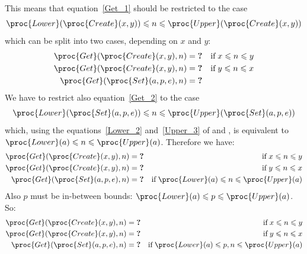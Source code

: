 \begin{itemize}
  This means that equation~\ref{Get_1} should be restricted to the
  case
  \[
    \proc{Lower} (\proc{Create} (x, y)) \leqslant n
    \leqslant \proc{Upper} (\proc{Create} (x, y))
  \]
  which can be split into two cases, depending on \(x\) and \(y\):
  \begin{align*}
     \proc{Get} (\proc{Create} (x, y), n)
  &= \textbf{?}
  & \text{if} \; x \leqslant n \leqslant y\\
     \proc{Get} (\proc{Create} (x, y), n)
  &= \textbf{?}
  & \text{if} \; y \leqslant n \leqslant x\\
     \proc{Get} (\proc{Set} (a, p, e), n)
  &= \textbf{?}
  \end{align*}
  We have to restrict also equation~\ref{Get_2} to the case
  \[
    \proc{Lower} (\proc{Set} (a, p, e)) \leqslant n
    \leqslant \proc{Upper} (\proc{Set} (a, p, e))
  \]
  which, using the equations~\ref{Lower_2} and~\ref{Upper_3} of
   and , is equivalent to
  \(
    \proc{Lower} (a) \leqslant n \leqslant \proc{Upper} (a)
  \).
  Therefore we have:
  \begin{align*}
     \proc{Get} (\proc{Create} (x, y), n)
  &= \textbf{?}
  & \text{if} \; x \leqslant n \leqslant y\\
     \proc{Get} (\proc{Create} (x, y), n)
  &= \textbf{?}
  & \text{if} \; y \leqslant n \leqslant x\\
     \proc{Get} (\proc{Set} (a, p, e), n)
  &= \textbf{?}
  & \text{if} \;\proc{Lower} (a) \leqslant n \leqslant \proc{Upper} (a)
  \end{align*}
  Also \(p\) must be in-between bounds:
  \(\proc{Lower} (a) \leqslant p \leqslant \proc{Upper} (a)\).
  So:
  \begin{align*}
     \proc{Get} (\proc{Create} (x, y), n)
  &= \textbf{?}
  & \text{if} \; x \leqslant n \leqslant y\\
     \proc{Get} (\proc{Create} (x, y), n)
  &= \textbf{?}
  & \text{if} \; y \leqslant n \leqslant x\\
     \proc{Get} (\proc{Set} (a, p, e), n)
  &= \textbf{?}
  & \text{if} \;\proc{Lower} (a) \leqslant p, n \leqslant \proc{Upper} (a)
  \end{align*}


\end{itemize}
